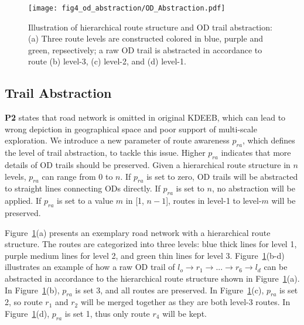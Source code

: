 \begin{figure}[t]
	\centering
	\texttt{[image: fig4\_od\_abstraction/OD\_Abstraction.pdf]}
	\vspace{-3mm}
	\caption{Illustration of hierarchical route structure and OD trail abstraction:
	(a) Three route levels are constructed colored in blue, purple and green, repsectively; a raw OD trail is abstracted in accordance to route (b) level-3, (c) level-2, and (d) level-1.}
	\label{fig:road_hierarchy}
	\vspace{-6mm}
\end{figure}

\subsection{Trail Abstraction}
\label{section: trail_abstraction}

\textbf{P2} states that road network is omitted in original KDEEB, which can lead to wrong depiction in geographical space and poor support of multi-scale exploration.
We introduce a new parameter of route awareness $p_{ra}$, which defines the level of trail abstraction, to tackle this issue.
Higher $p_{ra}$ indicates that more details of OD trails should be preserved.
Given a hierarchical route structure in $n$ levels, $p_{ra}$ can range from 0 to $n$.
If $p_{ra}$ is set to zero, OD trails will be abstracted to straight lines connecting ODs directly.
If $p_{ra}$ is set to $n$, no abstraction will be applied.
If $p_{ra}$ is set to a value $m$ in [1, $n-1$], routes in level-1 to level-$m$ will be preserved.

Figure~\ref{fig:road_hierarchy}(a) presents an exemplary road network with a hierarchical route structure.
The routes are categorized into three levels: blue thick lines for level 1, purple medium lines for level 2, and green thin lines for level 3.
Figure~\ref{fig:road_hierarchy}(b-d) illustrates an example of how a raw OD trail of $l_o \rightarrow r_1 
\rightarrow...\rightarrow r_6 \rightarrow l_d$ can be abstracted in accordance to the hierarchical route structure shown in Figure~\ref{fig:road_hierarchy}(a).
In Figure~\ref{fig:road_hierarchy}(b), $p_{ra}$ is set 3, and all routes are preserved.
In Figure~\ref{fig:road_hierarchy}(c), $p_{ra}$ is set 2, so route $r_1$ and $r_2$ will be merged together as they are both level-3 routes.
In Figure~\ref{fig:road_hierarchy}(d), $p_{ra}$ is set 1, thus only route $r_4$ will be kept.